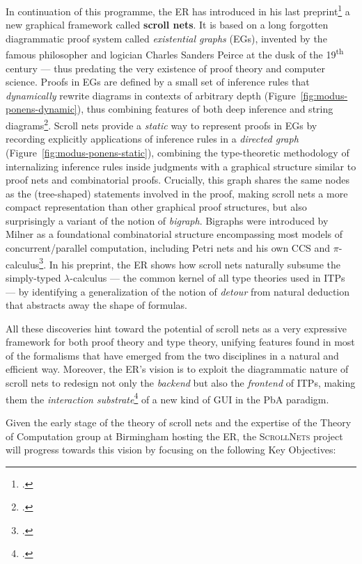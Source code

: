 \documentclass[12pt,draftproposal]{msca-pf}
\newcommand{\proj}{\small\textsc{ScrollNets}}
\begin{document}
In continuation of this programme, the ER has introduced in his last
preprint\footcite{donatoScrollNets2025} a new graphical framework called \textbf{scroll nets}. It is
based on a long forgotten diagrammatic proof system called \emph{existential graphs} (EGs), invented
by the famous philosopher and logician Charles Sanders Peirce at the dusk of the
19\textsuperscript{th} century --- thus predating the very existence of proof theory and computer
science. Proofs in EGs are defined by a small set of inference rules that \emph{dynamically} rewrite
diagrams in contexts of arbitrary depth (Figure~\ref{fig:modus-ponens-dynamic}), thus combining
features of both deep inference and string diagrams\footcite{bonchi_diagrammatic_2024}. Scroll nets
provide a \emph{static} way to represent proofs in EGs by recording explicitly applications of
inference rules in a \emph{directed graph} (Figure~\ref{fig:modus-ponens-static}), combining the
type-theoretic methodology of internalizing inference rules inside judgments with a graphical
structure similar to proof nets and combinatorial proofs. Crucially, this graph shares the same
nodes as the (tree-shaped) statements involved in the proof, making scroll nets a more compact
representation than other graphical proof structures, but also surprisingly a variant of the notion
of \emph{bigraph}. Bigraphs were introduced by Milner as a foundational combinatorial structure
encompassing most models of concurrent/parallel computation, including Petri nets and his own CCS
and $\pi$-calculus\footcite{milnerBigraphicalReactiveSystems2001}. In his preprint, the ER shows how
scroll nets naturally subsume the simply-typed $\lambda$-calculus --- the common kernel of all type
theories used in ITPs --- by identifying a generalization of the notion of \emph{detour} from
natural deduction that abstracts away the shape of formulas.

All these discoveries hint toward the potential of scroll nets as a very expressive framework for
both proof theory and type theory, unifying features found in most of the formalisms that have
emerged from the two disciplines in a natural and efficient way. Moreover, the ER's vision is to
exploit the diagrammatic nature of scroll nets to redesign not only the \emph{backend} but also the
\emph{frontend} of ITPs, making them the \emph{interaction
substrate}\footcite{mackayInteractionSubstratesCombining2025} of a new kind of GUI in the PbA
paradigm.

Given the early stage of the theory of scroll nets and the expertise of the Theory of Computation
group at Birmingham hosting the ER, the {\proj} project will progress towards this vision by
focusing on the following Key Objectives:
\end{document}
